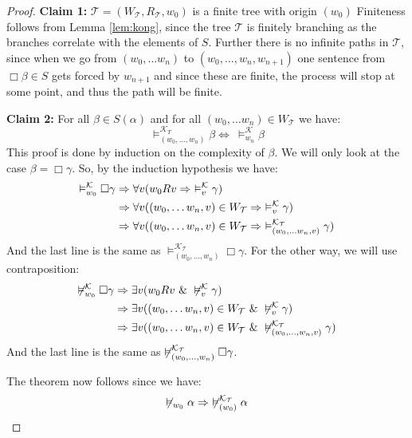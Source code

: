 \documentclass[../main.tex]{subfiles}
\begin{document}
\begin{proof}
	\textbf{Claim 1:} $\mathcal{T}=(W_{\mathcal{T}},R_{\mathcal{T}},w_0)$ is a finite tree with origin $(w_0)$
	Finiteness follows from Lemma \ref{lem:kong}, since the tree $\mathcal{T}$
	is finitely branching as the branches correlate with the elements
	of $S$. Further there is no infinite paths in $\mathcal{T}$, since when
	we go from $(w_0,\ldots w_n)$ to $(w_0,\ldots, w_n,w_{n+1})$ one
	sentence from $\Box\beta\in S$ gets forced by $w_{n+1 }$ and since
	these are finite, the process will stop at some point, and thus the
	path will be finite.

	\textbf{Claim 2:} For all $\beta\in S(\alpha)$ and for all $(w_0,\ldots
	w_n)\in W_{\mathcal{T}}$ we have:
	$$\vDash^{\mathcal{K}_T}_{(w_0,\ldots,w_n)}\beta\Leftrightarrow\ \vDash_{w_n}^\mathcal{K}\beta$$
	This proof is done by induction on the complexity of $\beta$. We will
	only look at the case $\beta=\Box\gamma$. So, by the induction
	hypothesis we have:
	\begin{align*}
		\vDash^{\mathcal{K}}_{w_0}\Box\gamma&\Rightarrow\forall v(w_0Rv\Rightarrow\ 
		\vDash^{\mathcal{K}}_v\gamma)\\
				      &\Rightarrow\forall v((w_0,\ldots
				      w_n,v)\in W_\T\Rightarrow\
				      \vDash^{\mathcal{K}}_v\gamma)\\
				      &\Rightarrow\forall v((w_0,\ldots
				      w_n,v)\in W_{\mathcal{T}}\Rightarrow\
				      \vDash_{(w_0,\ldots
				      w_n,v)}^{\mathcal{K}_\mathcal{T}}\gamma)
	\end{align*}
	And the last line is the same as $\vDash^{\mathcal{K}_\mathcal{T}}_{(w_0,\ldots,w_n)}\Box\gamma$.
	For the other way, we will use contraposition:
	\begin{align*}
		\not\vDash^{\mathcal{K}}_{w_0}\Box\gamma&\Rightarrow \exists v(w_0Rv\ \&\
		\not\vDash^{\mathcal{K}}_v\gamma)\\
					  &\Rightarrow\exists v((w_0,\ldots
					  w_n,v)\in W_{\mathcal{T}}\ \&\
					  \not\vDash^{\mathcal{K}}_v\gamma)\\
					  &\Rightarrow\exists v((w_0,\ldots
					  w_n,v)\in W_{\mathcal{T}}\ \&\
					  \not\vDash_{(w_0,\ldots,w_n,v)}^{\mathcal{K}_\mathcal{T}}\gamma)
	\end{align*}
	And the last line is the same as
	$\not\vDash^{\mathcal{K}_{\mathcal{T}}}_{(w_0,\ldots,w_n)}\Box\gamma$. 

	The theorem now follows since we have:
	\[\not\vDash_{w_0}\alpha\Rightarrow\
	\not\vDash_{(w_0)}^{\mathcal{K}_{\mathcal{T}}}\alpha\]
\end{proof}
\end{document}
